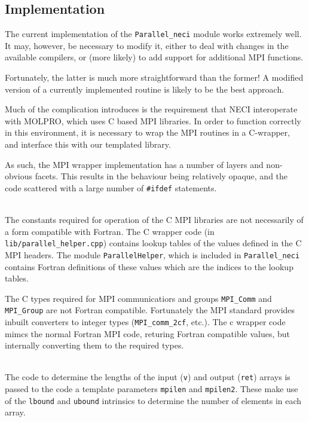 \documentclass[a4paper,notitlepage,dvipsnames]{scrreprt}
\newcommand\headitem[1]{\needspace{1.5\baselineskip}\item[{\boldmath #1 \nopagebreak}] \hfill \\ \nopagebreak}
\let\code\lstinline
\begin{document}
{{{\subsection{Implementation}
	The current implementation of the \code{Parallel_neci} module works
	extremely well. It may, however, be necessary to modify it, either to
	deal with changes in the available compilers, or (more likely) to add
	support for additional MPI functions.

	Fortunately, the latter is much more straightforward than the former!
	A modified version of a currently implemented routine is likely to be
	the best approach.

	Much of the complication introduces is the requirement that NECI
	interoperate with MOLPRO, which uses C based MPI libraries. In order
	to function correctly in this environment, it is necessary to wrap
	the MPI routines in a C-wrapper, and interface this with our
	templated library.

	As such, the MPI wrapper implementation has a number of layers and
	non-obvious facets. This results in the behaviour being relatively
	opaque, and the code scattered with a large number of \code{#ifdef}
	statements.
	\begin{description}
		\headitem{C-wrapper initialisation}
			The constants required for operation of the C MPI
			libraries are not necessarily of a form compatible with
			Fortran. The C wrapper code (in
			\code{lib/parallel_helper.cpp}) contains lookup tables of
			the values defined in the C MPI headers. The module
			\code{ParallelHelper}, which is included in
			\code{Parallel_neci} contains Fortran definitions of these
			values which are the indices to the lookup tables.

			The C types required for MPI communicatiors and groups
			\code{MPI_Comm} and \code{MPI_Group} are not Fortran
			compatible. Fortunately the MPI standard provides inbuilt
			converters to integer types (\code{MPI_comm_2cf}, etc.).
			The c wrapper code mimcs the normal Fortran MPI
			code, returing Fortran compatible values, but internally
			converting them to the required types.


		\headitem{Determination of parameter sizes}
			The code to determine the lengths of the input (\code{v})
			and output (\code{ret}) arrays is passed to the code a
			template parameters \code{mpilen} and \code{mpilen2}. These
			make use of the \code{lbound} and \code{ubound} intrinsics
			to determine the number of elements in each array.


\end{description}}}}
\end{document}

